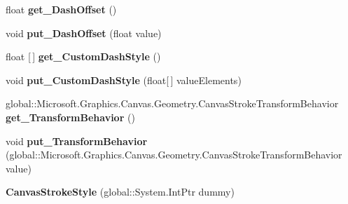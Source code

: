\begin{DoxyCompactItemize}
float {\bfseries get\+\_\+\+Dash\+Offset} ()
\item 
\mbox{\label{class_microsoft_1_1_graphics_1_1_canvas_1_1_geometry_1_1_canvas_stroke_style_a01c2250f29f3c8b71ac14ac77e246dff}} 
void {\bfseries put\+\_\+\+Dash\+Offset} (float value)
\item 
\mbox{\label{class_microsoft_1_1_graphics_1_1_canvas_1_1_geometry_1_1_canvas_stroke_style_aed5aa05f608f3835623113c1f789483d}} 
float \mbox{[}$\,$\mbox{]} {\bfseries get\+\_\+\+Custom\+Dash\+Style} ()
\item 
\mbox{\label{class_microsoft_1_1_graphics_1_1_canvas_1_1_geometry_1_1_canvas_stroke_style_aeae34150ee1e2fcb07c434a9371be1da}} 
void {\bfseries put\+\_\+\+Custom\+Dash\+Style} (float\mbox{[}$\,$\mbox{]} value\+Elements)
\item 
\mbox{\label{class_microsoft_1_1_graphics_1_1_canvas_1_1_geometry_1_1_canvas_stroke_style_a26b6c215fb7192fa54e07e53785f0568}} 
global\+::\+Microsoft.\+Graphics.\+Canvas.\+Geometry.\+Canvas\+Stroke\+Transform\+Behavior {\bfseries get\+\_\+\+Transform\+Behavior} ()
\item 
\mbox{\label{class_microsoft_1_1_graphics_1_1_canvas_1_1_geometry_1_1_canvas_stroke_style_acc734915b10b7dd019e5423b04d56a48}} 
void {\bfseries put\+\_\+\+Transform\+Behavior} (global\+::\+Microsoft.\+Graphics.\+Canvas.\+Geometry.\+Canvas\+Stroke\+Transform\+Behavior value)
\item 
\mbox{\label{class_microsoft_1_1_graphics_1_1_canvas_1_1_geometry_1_1_canvas_stroke_style_a84473c4c8d10c25462fa224a25dae41b}} 
{\bfseries Canvas\+Stroke\+Style} (global\+::\+System.\+Int\+Ptr dummy)
\item 
\mbox{\label{class_microsoft_1_1_graphics_1_1_canvas_1_1_geometry_1_1_canvas_stroke_style_ad363b1ddc2f498a833220cbfda7cee42}} 

\end{DoxyCompactItemize}
